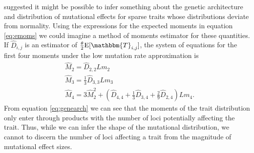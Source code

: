 \citet{Schraiber2015} suggested it might be possible to infer something about
the genetic architecture and distribution of mutational effects for sparse
traits whose distributions deviate from normality. Using the expressions for the
expected moments in equation \eqref{eq:emoms} we could imagine a method of
moments estimator for these quantities. If $\hat{D}_{i,j}$ is an estimator of
$\T \E[\mathbbm{T}_{i,j}]$, the system of equations for the first four moments
under the low mutation rate approximation is
\begin{align}
\label{eq:genearch}
  &\hat{M}_2 = \hat{D}_{2,2}Lm_2 \nonumber \\
  &\hat{M}_3 = \frac{1}{3}\hat{D}_{3,3}Lm_3 \nonumber \\
  &\hat{M}_4 = 3\hat{M}_2^2 + (\hat{D}_{4,4} + \frac{1}{3} \hat{D}_{3,4} + \frac{2}{9} \hat{D}_{2,4})Lm_4.
\end{align}
From equation \eqref{eq:genearch} we can see that the moments of the trait
distribution only enter through products with the number of loci potentially
affecting the trait. Thus, while we can infer the shape of the mutational
distribution, we cannot to discern the number of loci affecting a trait from the
magnitude of mutational effect sizes.

